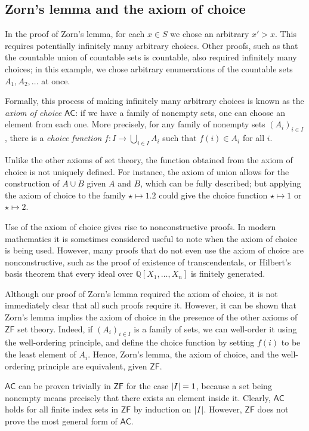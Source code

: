 \subsection{Zorn's lemma and the axiom of choice}
In the proof of Zorn's lemma, for each \( x \in S \) we chose an arbitrary \( x' > x \).
This requires potentially infinitely many arbitrary choices.
Other proofs, such as that the countable union of countable sets is countable, also required infinitely many choices; in this example, we chose arbitrary enumerations of the countable sets \( A_1, A_2, \dots \) at once.

Formally, this process of making infinitely many arbitrary choices is known as the \emph{axiom of choice} \( \mathsf{AC} \): if we have a family of nonempty sets, one can choose an element from each one.
More precisely, for any family of nonempty sets \( (A_i)_{i \in I} \), there is a \emph{choice function} \( f \colon I \to \bigcup_{i \in I} A_i \) such that \( f(i) \in A_i \) for all \( i \).

Unlike the other axioms of set theory, the function obtained from the axiom of choice is not uniquely defined.
For instance, the axiom of union allows for the construction of \( A \cup B \) given \( A \) and \( B \), which can be fully described; but applying the axiom of choice to the family \( \star \mapsto \qty{1, 2} \) could give the choice function \( \star \mapsto 1 \) or \( \star \mapsto 2 \).

Use of the axiom of choice gives rise to nonconstructive proofs.
In modern mathematics it is sometimes considered useful to note when the axiom of choice is being used.
However, many proofs that do not even use the axiom of choice are nonconstructive, such as the proof of existence of transcendentals, or Hilbert's basis theorem that every ideal over \( \mathbb Q[X_1, \dots, X_n] \) is finitely generated.

Although our proof of Zorn's lemma required the axiom of choice, it is not immediately clear that all such proofs require it.
However, it can be shown that Zorn's lemma implies the axiom of choice in the presence of the other axioms of \( \mathsf{ZF} \) set theory.
Indeed, if \( (A_i)_{i \in I} \) is a family of sets, we can well-order it using the well-ordering principle, and define the choice function by setting \( f(i) \) to be the least element of \( A_i \).
Hence, Zorn's lemma, the axiom of choice, and the well-ordering principle are equivalent, given \( \mathsf{ZF} \).

\( \mathsf{AC} \) can be proven trivially in \( \mathsf{ZF} \) for the case \( \abs{I} = 1 \), because a set being nonempty means precisely that there exists an element inside it.
Clearly, \( \mathsf{AC} \) holds for all finite index sets in \( \mathsf{ZF} \) by induction on \( \abs{I} \).
However, \( \mathsf{ZF} \) does not prove the most general form of \( \mathsf{AC} \).

